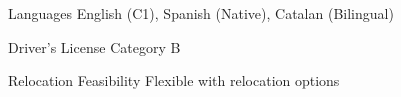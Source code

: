 

\begin{cvskills}

\cvskill
  {Languages}
  {English (C1), Spanish (Native), Catalan (Bilingual)}

\cvskill
  {Driver's License}
  {Category B}

\cvskill
  {Relocation Feasibility}
  {Flexible with relocation options}

\end{cvskills}
